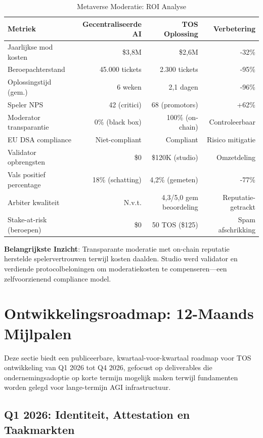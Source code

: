 \documentclass[11pt]{article}
\begin{document}
\begin{table}[H]
\centering
\caption{Metaverse Moderatie: ROI Analyse}
\label{tab:metaverse-roi}
\begin{tabular}{@{}lrrr@{}}
\toprule
\textbf{Metriek} & \textbf{Gecentraliseerde AI} & \textbf{TOS Oplossing} & \textbf{Verbetering} \\ \midrule
Jaarlijkse mod kosten & \$3,8M & \$2,6M & -32\% \\
Beroepachterstand & 45.000 tickets & 2.300 tickets & -95\% \\
Oplossingstijd (gem.) & 6 weken & 2,1 dagen & -96\% \\
Speler NPS & 42 (critici) & 68 (promotors) & +62\% \\
Moderator transparantie & 0\% (black box) & 100\% (on-chain) & Controleerbaar \\
EU DSA compliance & Niet-compliant & Compliant & Risico mitigatie \\
Validator opbrengsten & \$0 & \$120K (studio) & Omzetdeling \\
Vals positief percentage & 18\% (schatting) & 4,2\% (gemeten) & -77\% \\
Arbiter kwaliteit & N.v.t. & 4,3/5,0 gem beoordeling & Reputatie-getrackt \\
Stake-at-risk (beroepen) & \$0 & 50 TOS (\$125) & Spam afschrikking \\
\bottomrule
\end{tabular}
\end{table}

\textbf{Belangrijkste Inzicht}: Transparante moderatie met on-chain reputatie herstelde spelervertrouwen terwijl kosten daalden. Studio werd validator en verdiende protocolbeloningen om moderatiekosten te compenseren—een zelfvoorzienend compliance model.

\section{Ontwikkelingsroadmap: 12-Maands Mijlpalen}
\label{sec:12month-roadmap}

Deze sectie biedt een publiceerbare, kwartaal-voor-kwartaal roadmap voor TOS ontwikkeling van Q1 2026 tot Q4 2026, gefocust op deliverables die ondernemingsadoptie op korte termijn mogelijk maken terwijl fundamenten worden gelegd voor lange-termijn AGI infrastructuur.

\subsection{Q1 2026: Identiteit, Attestation en Taakmarkten}
\end{document}
